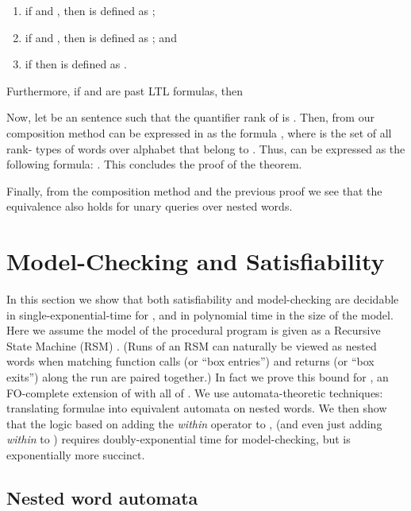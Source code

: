 \documentclass{LMCS}
\newcommand{\FO}{{\rm FO}}
\theoremstyle{plain}
\theoremstyle{definition}
\begin{document}
{\begin{enumerate}[]
\begin{enumerate}[(1)]
\begin{enumerate}[(a)]
\item .

\end{enumerate}

\item if  and , then
 is defined as ;

\item if  and , then
 is defined as ; and

\item if  then  is
defined as . 

\end{enumerate} 

Furthermore, if 
and  are past LTL formulas, then  \end{enumerate}

Now, let  be an  sentence such that the
quantifier rank of  is . Then, from our composition method
 can be expressed in  as the formula
, where  is the set of all rank- types of words over
alphabet  that belong to . Thus,  can be expressed as the
following  formula: . This concludes the proof of the
theorem.

Finally, from the composition method and the previous proof we see
that the equivalence  also holds for unary
queries over nested words.}





\section{Model-Checking and Satisfiability}
\label{mc-sec}

\noindent In this section we show that both satisfiability and model-checking
are decidable in single-exponential-time for , and
in polynomial time in the size of the model.
Here we assume the model of the procedural
program is given as a Recursive State Machine (RSM) \cite{RSM}.
(Runs of an RSM can naturally be viewed as nested words
 when matching function calls (or ``box entries'') and returns 
 (or ``box exits'') along the run are paired together.) 
In fact we prove this bound
for , an \FO-complete extension of  with all of . We use automata-theoretic techniques: 
translating formulae into equivalent automata on nested words. We then
show that the logic based on adding the
{\em within} operator to , (and even just adding 
{\em within} to ) 
 requires doubly-exponential time for
model-checking, but is exponentially more succinct.

\subsection{Nested word automata}
\end{document}
